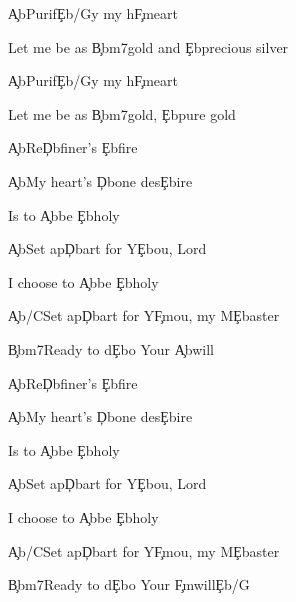\documentclass[9pt]{extarticle}
\begin{document}
\bsong

\bv
\c{Ab}Purif\c{Eb/G}y my h\c{Fm}eart

Let me be as \c{Bbm7}gold and \c{Eb}precious silver

\c{Ab}Purif\c{Eb/G}y my h\c{Fm}eart

Let me be as \c{Bbm7}gold, \c{Eb}pure gold
\ev

\bc
\c{Ab}Re\c{Db}finer's \c{Eb}fire

\c{Ab}My heart's \c{Db}one des\c{Eb}ire

Is to \c{Ab}be \c{Eb}holy

\c{Ab}Set ap\c{Db}art for Y\c{Eb}ou, Lord

I choose to \c{Ab}be \c{Eb}holy

\c{Ab/C}Set ap\c{Db}art for Y\c{Fm}ou, my M\c{Eb}aster

\c{Bbm7}Ready to d\c{Eb}o Your \c{Ab}will
\ec


\bc
\c{Ab}Re\c{Db}finer's \c{Eb}fire

\c{Ab}My heart's \c{Db}one des\c{Eb}ire

Is to \c{Ab}be \c{Eb}holy

\c{Ab}Set ap\c{Db}art for Y\c{Eb}ou, Lord

I choose to \c{Ab}be \c{Eb}holy

\c{Ab/C}Set ap\c{Db}art for Y\c{Fm}ou, my M\c{Eb}aster

\c{Bbm7}Ready to d\c{Eb}o Your \c{Fm}will\c{Eb/G}
\ec


\esong
\end{document}

